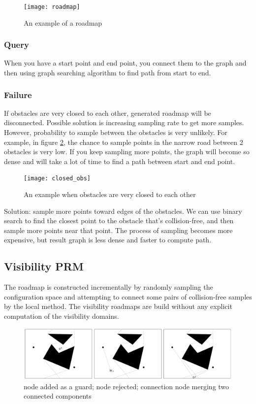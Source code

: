 \documentclass[11pt]{article}
\begin{document}
\begin{figure}[h]
\texttt{[image: roadmap]}
\centering
\caption{An example of a roadmap }
\label{fig:roadmap_example}
\end{figure}

\subsubsection{Query}
When you have a start point and end point, you connect them to the graph and then using graph searching algorithm to find path from start to end.

\subsubsection{Failure}
If obstacles are very closed to each other, generated roadmap will be disconnected. Possible solution is increasing sampling rate to get more samples. However, probability to sample between the obstacles is very unlikely. For example, in figure \ref{fig:closed_obs}, the chance to sample points in the narrow road between 2 obstacles is very low. If you keep sampling more points, the graph will become so dense and will take a lot of time to find a path between start and end point.\\
\begin{figure}
\texttt{[image: closed\_obs]}
\centering
\caption{An example when obstacles are very closed to each other}
\label{fig:closed_obs}
\end{figure}
Solution: sample more points toward edges of the obstacles. We can use binary search to find the closest point to the obstacle that's collision-free, and then sample more points near that point. The process of sampling becomes more expensive, but result graph is less dense and faster to compute path.

\subsection{Visibility PRM}
The roadmap is constructed incrementally by randomly sampling the configuration space and attempting to connect some pairs of collision-free samples by the local method.
The visibility roadmaps are build without any explicit computation of the visibility domains.
\begin{figure}[h]
\includegraphics[width=15cm]{visibility_prm_visual}
\centering
\caption{node added as a guard; node rejected; connection node merging two connected components}
\label{fig:visprm_visual}
\end{figure}
\end{document}
